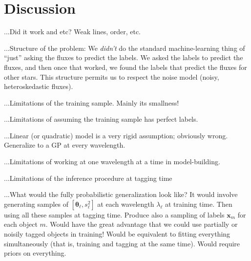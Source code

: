 \documentclass[12pt, preprint]{aastex}
\newcommand{\set}[1]{\bm{#1}}
\newcommand{\teff}{\mbox{$\rm T_{eff}$}}
\newcommand{\feh}{\mbox{$\rm [Fe/H]$}}
\newcommand{\logg}{\mbox{$\rm \log g$}}
\begin{document}
%
%
%
%
%


\section{Discussion}

...Did it work and etc?  Weak lines, order, etc.

...Structure of the problem:
We \emph{didn't} do the standard machine-learning thing of ``just'' asking the fluxes to predict the labels.
We asked the labels to predict the fluxes, and then once that worked, we found the labels that predict the fluxes for other stars.
This structure permits us to respect the noise model (noisy, heteroskedastic fluxes).

...Limitations of the training sample.  Mainly its smallness!

...Limitations of assuming the training sample has perfect labels.

...Linear (or quadratic) model is a very rigid assumption; obviously wrong.
Generalize to a GP at every wavelength.

...Limitations of working at one wavelength at a time in model-building.

...Limitations of the inference procedure at tagging time

...What would the fully probabilistic generalization look like?
It would involve generating samples of $[\set{\theta}_\ell, s_\ell^2]$ at each wavelength $\lambda_\ell$ at training time.
Then using all these samples at tagging time.
Produce also a sampling of labels $\set{x}_m$ for each object $m$.
Would have the great advantage that we could use partially or noisily tagged objects in training!
Would be equivalent to fitting everything simultaneously (that is, training and tagging at the same time).
Would require priors on everything.
\end{document}
